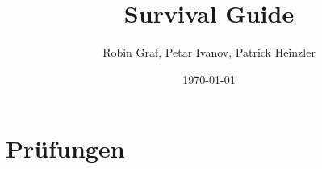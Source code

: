 \documentclass[11pt, a4paper, oneside]{book}
\author{Robin Graf, Petar Ivanov, Patrick Heinzler}
\title{Survival Guide}
\date{\today}
\begin{document}
    

\chapter{Prüfungen}
\end{document}
